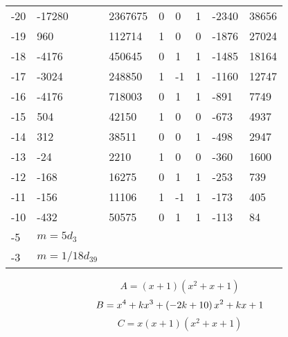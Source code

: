 \documentclass{amsart}
\begin{document}
\begin{longtable}{|l|l|l|lllll|}
-20&-17280&2367675&0&0&1&-2340&38656\\
-19&960&112714&1&0&0&-1876&27024\\
-18&-4176&450645&0&1&1&-1485&18164\\
-17&-3024&248850&1&-1&1&-1160&12747\\
-16&-4176&718003&0&1&1&-891&7749\\
-15&504&42150&1&0&0&-673&4937\\
-14&312&38511&0&0&1&-498&2947\\
-13&-24&2210&1&0&0&-360&1600\\
-12&-168&16275&0&1&1&-253&739\\
-11&-156&11106&1&-1&1&-173&405\\
-10&-432&50575&0&1&1&-113&84\\
-5&$m=5d_{3}$&&\multicolumn{5}{c|}{}\\
-3&$m=1/18d_{39}$&&\multicolumn{5}{c|}{}\\
\hline
\end{longtable}
$$A=(x
 + 1)(x^2
 + x
 + 1)$$
$$B=x^4
 + k\*x^3
 + \left(-2\*k
 + 10\right) \*x^2
 + k\*x
 + 1$$
$$C=x(x
 + 1)(x^2
 + x
 + 1)$$
\end{document}
